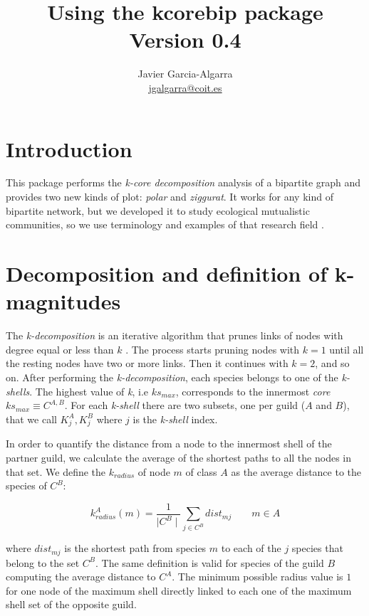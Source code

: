 \documentclass[12pt]{article}
\title{Using the kcorebip package \\ \small{Version 0.4}}
\author{Javier Garcia-Algarra \\ \href{mailto:jgalgarra@coit.es}{jgalgarra@coit.es} }
\begin{document}
\flushbottom
\maketitle
\thispagestyle{empty}

\section*{Introduction}

This package performs the \textit{k-core decomposition} analysis of a bipartite graph and provides two new kinds of plot: \textit{polar} and \textit{ziggurat}. It works for
any kind of bipartite network, but we developed it to study ecological mutualistic communities, so we use terminology and examples of that research field \cite{Garcia-Algarra2017}.

\section*{Decomposition and definition of k-magnitudes}
\label{K-magnitudes}

The \textit{k-decomposition} is an iterative algorithm that prunes links of nodes with degree equal or less than $k$ \cite{seidman1983network}. The process starts pruning nodes with $k=1$ until all the resting nodes have two or more links. Then it continues with $k=2$, and so on. After performing the \textit{k-decomposition}, each species belongs to one of the \textit{k-shells}. The highest value of \textit{k}, i.e $ks_{max}$, corresponds to the innermost \textit{core} $ks_{max}\equiv C^{A,B}$. For each \textit{k-shell} there are two subsets, one per guild ($A$ and $B$), that we call $K^{A}_{j}, K^{B}_{j}$ where $j$ is the \textit{k-shell} index.

In order to quantify the distance from a node to the innermost shell of the partner guild, we calculate the average of the shortest paths to all the nodes in that set. We define the \textit{$k_{radius}$} of node $m$ of class $A$ as the average distance to the species of $C^B$:

\begin{equation}
\displaystyle
k^A_{radius}(m) = \frac{1}{\mid C^{B} \mid}\sum\limits_{j \in C^{B}} dist_{mj}  \qquad   m \in A
\label{kradius}
\end{equation}

\noindent where $dist_{mj}$ is the shortest path from species $m$ to each of the $j$ species that belong to the set $C^B$. The same definition is valid for species of the guild $B$ computing the average distance to $C^A$. The minimum possible radius value is $1$ for one node of the maximum shell directly linked to each one of the maximum shell set of the opposite guild.
\end{document}
